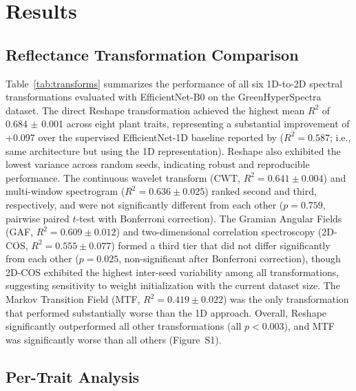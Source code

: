 \section{Results}
\label{sec:results}

\subsection{Reflectance Transformation Comparison}
\label{sec:results_transforms}

Table~\ref{tab:transforms} summarizes the performance of all six 1D-to-2D spectral transformations evaluated with EfficientNet-B0 on the GreenHyperSpectra dataset. The direct Reshape transformation achieved the highest mean $R^2$ of 0.684 $\pm$ 0.001 across eight plant traits, representing a substantial improvement of +0.097 over the supervised EfficientNet-1D baseline reported by \citet{cherif2025greenhyperspectra} ($R^2 = 0.587$; i.e., same architecture but using the 1D representation). Reshape also exhibited the lowest variance across random seeds, indicating robust and reproducible performance. The continuous wavelet transform (CWT, $R^2 = 0.641 \pm 0.004$) and multi-window spectrogram ($R^2 = 0.636 \pm 0.025$) ranked second and third, respectively, and were not significantly different from each other ($p = 0.759$, pairwise paired $t$-test with Bonferroni correction). The Gramian Angular Fields (GAF, $R^2 = 0.609 \pm 0.012$) and two-dimensional correlation spectroscopy (2D-COS, $R^2 = 0.555 \pm 0.077$) formed a third tier that did not differ significantly from each other ($p = 0.025$, non-significant after Bonferroni correction), though 2D-COS exhibited the highest inter-seed variability among all transformations, suggesting sensitivity to weight initialization with the current dataset size. The Markov Transition Field (MTF, $R^2 = 0.419 \pm 0.022$) was the only transformation that performed substantially worse than the 1D approach. Overall, Reshape significantly outperformed all other transformations (all $p < 0.003$), and MTF was significantly worse than all others (Figure~S1).



\subsection{Per-Trait Analysis}
\label{sec:results_per_trait}

